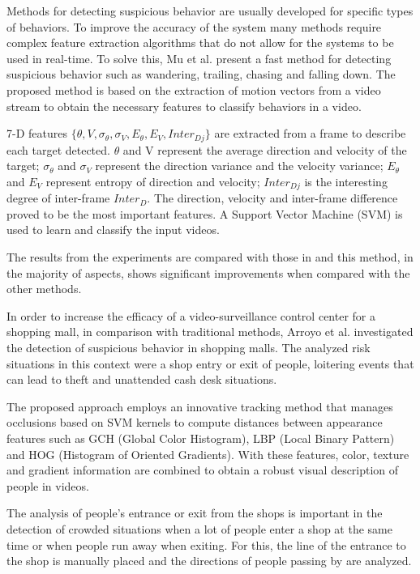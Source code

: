 Methods for detecting suspicious behavior are usually developed for specific types of behaviors. To improve the accuracy of the system many methods require complex feature extraction algorithms that do not allow for the systems to be used in real-time. To solve this, Mu et al. \cite{n7} present a fast method for detecting suspicious behavior such as wandering, trailing, chasing and falling down. The proposed method is based on the extraction of motion vectors from a video stream to obtain the necessary features to classify behaviors in a video.

7-D features \(\{\theta, V, \sigma_{\theta}, \sigma_{V}, E_{\theta}, E_{V}, Inter_{Dj}\} \) are extracted from a frame to describe each target detected. \(\theta\) and V represent the average direction and velocity of the target; \(\sigma_{\theta}\) and \(\sigma_{V}\) represent the direction variance and the velocity variance; \(E_{\theta}\) and \(E_{V}\) represent entropy of direction and velocity; \(Inter_{Dj}\) is the interesting degree of inter-frame \(Inter_{D}\). The direction, velocity and inter-frame difference proved to be the most important features. A Support Vector Machine (SVM) is used to learn and classify the input videos.

The results from the experiments are compared with those in \cite{n8,n9,n10,n11} and this method, in the majority of aspects, shows significant improvements when compared with the other methods.

In order to increase the efficacy of a video-surveillance control center for a shopping mall, in comparison with traditional methods, Arroyo et al. \cite{n12} investigated the detection of suspicious behavior in shopping malls. The analyzed risk situations in this context were a shop entry or exit of people, loitering events that can lead to theft and unattended cash desk situations.

The proposed approach employs an innovative tracking method that manages occlusions based on SVM kernels to compute distances between appearance features such as GCH (Global Color Histogram), LBP (Local Binary Pattern) and HOG (Histogram of Oriented Gradients). With these features, color, texture and gradient information are combined to obtain a robust visual description of people in videos.

The analysis of people's entrance or exit from the shops is important in the detection of crowded situations when a lot of people enter a shop at the same time or when people run away when exiting. For this, the line of the entrance to the shop is manually placed and the directions of people passing by are analyzed.

